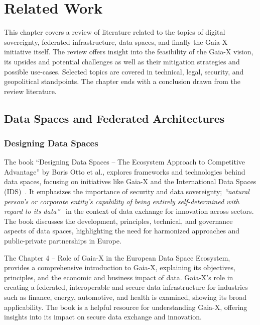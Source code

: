 \chapter{Related Work}\label{ch:related-work}

\begin{chapterabstract}
    This chapter covers a review of literature related to the topics of digital sovereignty, federated infrastructure, data spaces, and finally the Gaia-X initiative itself.
    The review offers insight into the feasibility of the Gaia-X vision, its upsides and potential challenges as well as their mitigation strategies and possible use-cases.
    Selected topics are covered in technical, legal, security, and geopolitical standpoints.
    The chapter ends with a conclusion drawn from the review literature.
\end{chapterabstract}

\section{Data Spaces and Federated Architectures}\label{sec:data-spaces-and-federated-architectures}
\subsection{Designing Data Spaces}\label{subsec:designing-data-spaces}

The book ``Designing Data Spaces -- The Ecosystem Approach to Competitive Advantage'' by Boris Otto et al., explores frameworks and technologies behind data spaces, focusing on initiatives like Gaia-X and the International Data Spaces (IDS)~\cite{designing_dataspaces}.
It emphasizes the importance of security and data sovereignty; \textit{``natural person’s or corporate entity’s capability of being entirely self-determined with regard to its data''}~\cite{designing_dataspaces} in the context of data exchange for innovation across sectors.
The book discusses the development, principles, technical, and governance aspects of data spaces, highlighting the need for harmonized approaches and public-private partnerships in Europe.

The Chapter 4 -- Role of Gaia-X in the European Data Space Ecosystem, provides a comprehensive introduction to Gaia-X, explaining its objectives, principles, and the economic and business impact of data.
Gaia-X's role in creating a federated, interoperable and secure data infrastructure for industries such as finance, energy, automotive, and health is examined, showing its broad applicability.
The book is a helpful resource for understanding Gaia-X, offering insights into its impact on secure data exchange and innovation.

